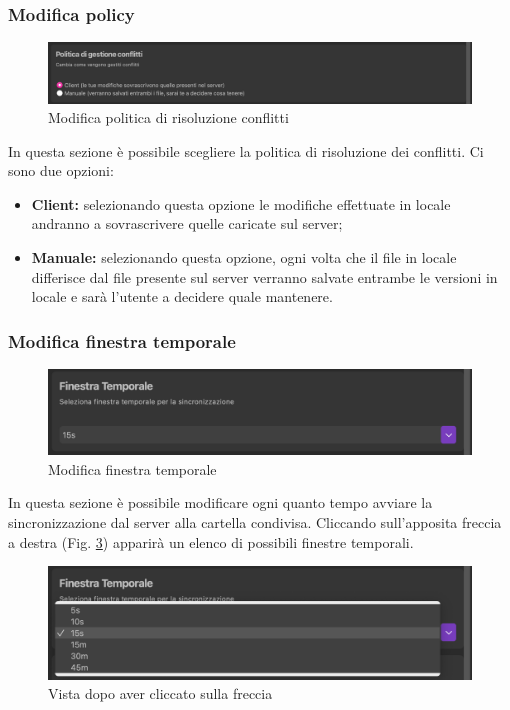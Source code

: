 \subsubsection{Modifica policy}
\label{sec:policy}
\begin{figure}[H]
    \centering
    \includegraphics[scale = 0.4]{components/img/ImpPolicy.png}
    \caption{Modifica politica di risoluzione conflitti}
    \label{fig:policy}
\end{figure}
In questa sezione è possibile scegliere la politica di risoluzione dei conflitti. Ci sono due opzioni:
\begin{itemize}
\item\textbf{Client:} selezionando questa opzione le modifiche effettuate in locale andranno a sovrascrivere quelle caricate sul server;\
\item\textbf{Manuale:} selezionando questa opzione, ogni volta che il file in locale differisce dal file presente sul server verranno salvate entrambe le versioni in locale e sarà l'utente a decidere quale mantenere.\
\end{itemize}

\subsubsection{Modifica finestra temporale}
\label{sec:finestra temporale}
\begin{figure}[H]
    \centering
    \includegraphics[scale = 0.65]{components/img/ImpFinTempA.png}
    \caption{Modifica finestra temporale}
    \label{fig:finTempA}
\end{figure}
In questa sezione è possibile modificare ogni quanto tempo avviare la sincronizzazione dal server alla cartella condivisa. Cliccando sull'apposita freccia a destra (Fig. \ref{fig:finTempC}) apparirà un elenco di possibili finestre temporali. 
\begin{figure}[H]
    \centering
    \includegraphics[scale = 0.65]{components/img/ImpFinTempC.png}
    \caption{Vista dopo aver cliccato sulla freccia}
    \label{fig:finTempC}
\end{figure}

